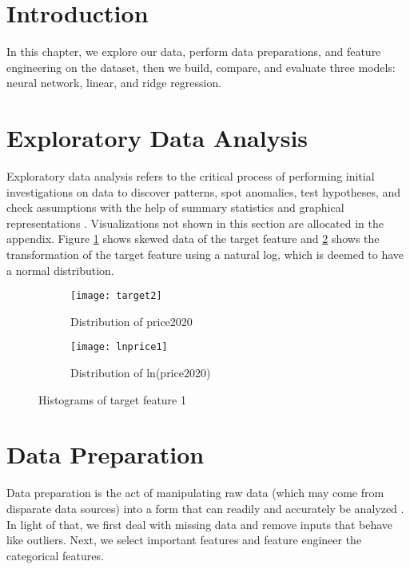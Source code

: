 
\begin{sloppypar}
	
	\section{Introduction}
	In this chapter, we explore our data, perform data preparations, and feature engineering on the dataset, then we build, compare, and evaluate three models: neural network, linear, and ridge regression.


	\section{Exploratory Data Analysis}
	Exploratory data analysis refers to the critical process of performing initial investigations on data to discover patterns, spot anomalies, test hypotheses, and check assumptions with the help of summary statistics and graphical representations \citep{Patil}. Visualizations not shown in this section are allocated in the appendix. \newline
	Figure \ref{fig:t2} shows skewed data of the target feature and \ref{fig:lnp1} shows the transformation of the target feature using a natural log, which is deemed to have a normal distribution.
	
	\begin{figure}[h!]
	\centering	
	\begin{subfigure}{0.49\textwidth}
		\centering
		\texttt{[image: target2]}
		\caption{Distribution of price2020}
		\label{fig:t2}
	\end{subfigure}
	\hfill
	\begin{subfigure}{0.49\textwidth}
		\centering
		\texttt{[image: lnprice1]}
		\caption{Distribution of ln(price2020)}
		\label{fig:lnp1}
	\end{subfigure}
	\caption{Histograms of target feature 1}	
	\label{fig:dist}
	\end{figure}

	
	\section{Data Preparation}
	Data preparation is the act of manipulating raw data (which may come from disparate data sources) into a form that can readily and accurately be analyzed \citep{Davidf}. In light of that, we first deal with missing data and remove inputs that behave like outliers. Next, we select important features and feature engineer the categorical features.


\end{sloppypar}
